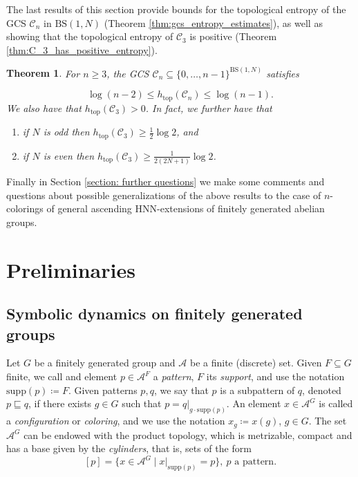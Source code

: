 \documentclass[cupthm,crop,info]{CUP-JNL-ETS}%
\theoremstyle{cupplain}
\newtheorem{theorem}{Theorem}[section]
\theoremstyle{cupdefinition}
\theoremstyle{cupremark}
\theoremstyle{cupproof}
\numberwithin{equation}{section}
\newcommand{\BS}[1][N]{\mathrm{BS}(1,#1)}
\def\htop{h_{\mathrm{top}}}
\providecommand{\DIFadd}[1]{{\protect\color{blue}\uwave{#1}}} %
\providecommand{\DIFdel}[1]{{\protect\color{red}\sout{#1}}}                      %
\providecommand{\DIFaddbegin}{} %
\providecommand{\DIFaddend}{} %
\providecommand{\DIFdelbegin}{} %
\providecommand{\DIFdelend}{} %
\newcommand{\DIFscaledelfig}{0.5}
\newlength{\DIFdelgraphicswidth} %
\newlength{\DIFdelgraphicsheight} %
\newcommand{\DIFaddincludegraphics}[2][]{{\color{blue}\fbox{\DIFOincludegraphics[#1]{#2}}}} %
\newcommand{\DIFdelincludegraphics}[2][]{%
\sbox{\DIFdelgraphicsbox}{\DIFOincludegraphics[#1]{#2}}%
\settoboxwidth{\DIFdelgraphicswidth}{\DIFdelgraphicsbox} %
\settoboxtotalheight{\DIFdelgraphicsheight}{\DIFdelgraphicsbox} %
\scalebox{\DIFscaledelfig}{%
\parbox[b]{\DIFdelgraphicswidth}{\usebox{\DIFdelgraphicsbox}\\[-\baselineskip] \rule{\DIFdelgraphicswidth}{0em}}\llap{\resizebox{\DIFdelgraphicswidth}{\DIFdelgraphicsheight}{%
\setlength{\unitlength}{\DIFdelgraphicswidth}%
\begin{picture}(1,1)%
\thicklines\linethickness{2pt} %
{\color[rgb]{1,0,0}\put(0,0){\framebox(1,1){}}}%
{\color[rgb]{1,0,0}\put(0,0){\line( 1,1){1}}}%
{\color[rgb]{1,0,0}\put(0,1){\line(1,-1){1}}}%
\end{picture}%
}\hspace*{3pt}}} %
} %
\DeclareRobustCommand{\DIFaddbegin}{\DIFOaddbegin \let\includegraphics\DIFaddincludegraphics} %
\DeclareRobustCommand{\DIFaddend}{\DIFOaddend \let\includegraphics\DIFOincludegraphics} %
\DeclareRobustCommand{\DIFdelbegin}{\DIFOdelbegin \let\includegraphics\DIFdelincludegraphics} %
\DeclareRobustCommand{\DIFdelend}{\DIFOaddend \let\includegraphics\DIFOincludegraphics} %
\begin{document}
The last results of this section provide bounds for the topological entropy of the GCS $\mathcal{C}_n$ in $\BS$ (Theorem \ref{thm:gcs_entropy_estimates}), as well as showing that the topological entropy of $\mathcal{C}_3$ is positive (Theorem \ref{thm:C_3_has_positive_entropy}).
\begin{theorem} \label{thm:summary_gcs_entropy}
	For $n\ge 3$, the GCS $\mathcal{C}_n\subseteq\{0,\ldots,n-1\}^{\BS}$ satisfies

	$$
	\log(n-2)\le\htop(\mathcal{C}_n)\le\log(n-1).
	$$
	We also have that $\htop(\mathcal{C}_3)>0$. In fact, we further have that
	\begin{enumerate}
		\item if $N$ is odd then $\htop(\mathcal{C}_3)\ge\frac{1}{2}\log 2$, and
		\item if $N$ is even then \DIFdelbegin \DIFdel{$\htop(\mathcal{C}_3)\ge\frac{1}{2(2N+1)}\log 2$}\DIFdelend \DIFaddbegin \DIFadd{$\htop(\mathcal{C}_3)\ge\frac{1}{2(N^2+1)}\log 2$}\DIFaddend .
	\end{enumerate}
\end{theorem}

Finally in Section \ref{section: further questions} we make some comments and questions about possible generalizations of the above results to the case of $n$-colorings of general ascending HNN-extensions of finitely generated abelian groups.




\section{Preliminaries}\label{section:preliminaries}

\subsection{Symbolic dynamics on finitely generated groups}
Let $G$ be a finitely generated group and $\mathcal{A}$ be a finite (discrete) set. Given $F\subseteq G$ finite, we call and element $p\in \mathcal{A}^{F}$ a \textit{pattern}, $F$ its \textit{support}, and use the notation $\mathrm{supp}(p)\coloneqq F$. Given patterns $p,q$, we say that $p$ is a subpattern of $q$, denoted $p\sqsubseteq q$, if there exists $g\in G$ such that $p=q|_{g\cdot \mathrm{supp}(p)}$. An element $x\in \mathcal{A}^G$ is called a \textit{configuration} or \textit{coloring}, and we use the notation $x_g\coloneqq x(g)$, $g\in G$. The set $\mathcal{A}^G$ can be endowed with the product topology, which is metrizable, compact and has a base given by the \textit{cylinders}, that is, sets of the form
$$
[p]=\{x\in \mathcal{A}^G\mid x|_{\mathrm{supp}(p)}=p \}, \ p\text{ a pattern}.
$$ 
\end{document}
